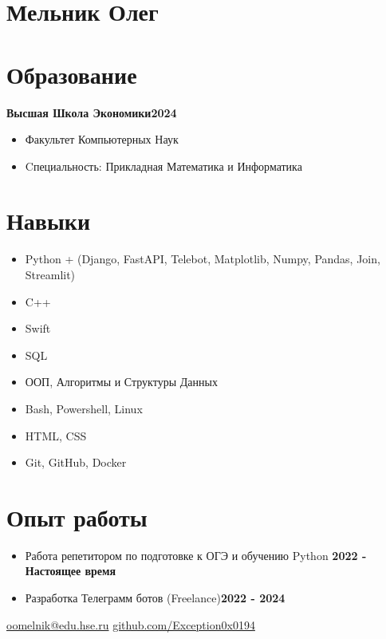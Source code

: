 \documentclass[11pt]{article}
\makeatletter
\newlength{\iconwidth}
\newcommand{\contact}{
    \footnotesize
    \textcolor{primary_color}{
        \faEnvelope \quad \href{mailto:oomelnik@edu.hse.ru}{oomelnik@edu.hse.ru}
        \hspace{3em}
        \faGithub \quad \href{https://github.com/Exception0x0194/SEU-CV}{github.com/Exception0x0194}
    }
}
\makeatother
\begin{document}
{\titleformat{\section}[block]{\LARGE\bfseries\color{primary_color}\centering}{}{0em}{}\section{Мельник Олег}}

\section{\makebox[\iconwidth][c]{\faGraduationCap}\quad Образование}

\textbf{Высшая Школа Экономики}\hfill \textbf{2024}
\begin{itemize}
    \item Факультет Компьютерных Наук
    \item Cпециальность: Прикладная Математика и Информатика
\end{itemize}

\section{\makebox[\iconwidth][c]{\faWrench}\quad Навыки}

\begin{itemize}
    \item Python + (Django, FastAPI, Telebot, Matplotlib, Numpy, Pandas, Join, Streamlit)
    \item C++
    \item Swift
    \item SQL
    \item ООП, Алгоритмы и Структуры Данных
    \item Bash, Powershell, Linux
    \item HTML, CSS
    \item Git, GitHub, Docker
\end{itemize}

\vspace{1em}

\section{\makebox[\iconwidth][c]{\faAtom}\quad Опыт работы}
\begin{itemize}
    \item Работа репетитором по подготовке к ОГЭ и обучению Python \hfill \textbf{2022 - Настоящее время}
    \item Разработка Телеграмм ботов (Freelance)\hfill \textbf{2022 - 2024}
\end{itemize}

\vspace{1em}

{\centering \contact \par}
\end{document}

